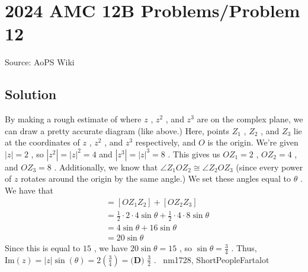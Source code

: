 \documentclass[12pt]{article}
\begin{document}
\section*{{2024 AMC 12B Problems/Problem 12}}
Source: AoPS Wiki

\subsection*{Solution}
By making a rough estimate of where $z$ , $z^2$ , and $z^3$ are on the complex plane, we can draw a pretty accurate diagram (like above.) Here, points $Z_1$ , $Z_2$ , and $Z_3$ lie at the coordinates of $z$ , $z^2$ , and $z^3$ respectively, and $O$ is the origin. We're given $|z|=2$ , so $|z^2|=|z|^2=4$ and $|z^3|=|z|^3 = 8$ . This gives us $OZ_1=2$ , $OZ_2=4$ , and $OZ_3=8$ . Additionally, we know that $\angle{Z_1OZ_2}\cong\angle{Z_2OZ_3}$ (since every power of $z$ rotates around the origin by the same angle.) We set these angles equal to $\theta$ . We have that
\begin{align*}
[OZ_1Z_2Z_3]&=[OZ_1Z_2]+[OZ_2Z_3] \\
&=\frac{1}{2}\cdot2\cdot4 \sin\theta+\frac{1}{2}\cdot4\cdot8 \sin\theta \\
&=4\sin\theta+16\sin\theta \\
&=20 \sin\theta
\end{align*} Since this is equal to $15$ , we have $20\sin\theta=15$ , so $\sin\theta=\frac{3}{4}$ . Thus, $\text{Im}(z)=|z|\sin(\theta)=2(\frac{3}{4})=\boxed{\textbf{(D) }\frac{3}{2}}$ . ~nm1728, ShortPeopleFartalot
\end{document}
